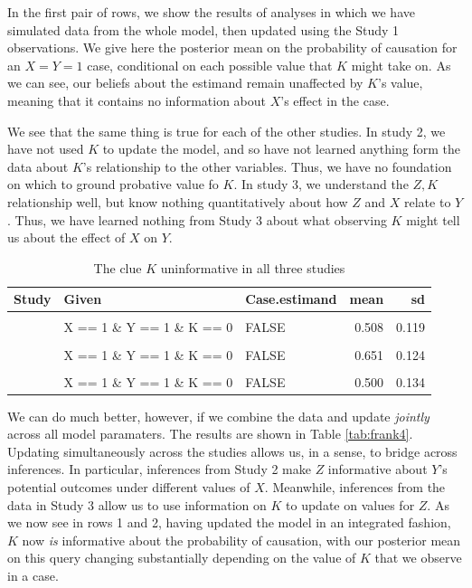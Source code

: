 \documentclass[
  12pt,
]{book}
\begin{document}
In the first pair of rows, we show the results of analyses in which we have simulated data from the whole model, then updated using the Study 1 observations. We give here the posterior mean on the probability of causation for an \(X=Y=1\) case, conditional on each possible value that \(K\) might take on. As we can see, our beliefs about the estimand remain unaffected by \(K\)'s value, meaning that it contains no information about \(X\)'s effect in the case.

We see that the same thing is true for each of the other studies. In study 2, we have not used \(K\) to update the model, and so have not learned anything form the data about \(K\)'s relationship to the other variables. Thus, we have no foundation on which to ground probative value fo \(K\). In study 3, we understand the \(Z,K\) relationship well, but know nothing quantitatively about how \(Z\) and \(X\) relate to \(Y\). Thus, we have learned nothing from Study 3 about what observing \(K\) might tell us about the effect of \(X\) on \(Y\).

\begin{table}

\caption{\label{tab:frank1}The clue $K$ uninformative in all three studies}
\centering
\begin{tabular}[t]{rllrr}
\toprule
Study & Given & Case.estimand & mean & sd\\
\midrule
\cellcolor{gray!6}{1} & \cellcolor{gray!6}{X == 1 \& Y == 1 \& K == 1} & \cellcolor{gray!6}{FALSE} & \cellcolor{gray!6}{0.592} & \cellcolor{gray!6}{0.126}\\
 & X == 1 \& Y == 1 \& K == 0 & FALSE & 0.508 & 0.119\\
\cellcolor{gray!6}{2} & \cellcolor{gray!6}{X == 1 \& Y == 1 \& K == 1} & \cellcolor{gray!6}{FALSE} & \cellcolor{gray!6}{0.650} & \cellcolor{gray!6}{0.122}\\
 & X == 1 \& Y == 1 \& K == 0 & FALSE & 0.651 & 0.124\\
\cellcolor{gray!6}{3} & \cellcolor{gray!6}{X == 1 \& Y == 1 \& K == 1} & \cellcolor{gray!6}{FALSE} & \cellcolor{gray!6}{0.500} & \cellcolor{gray!6}{0.158}\\
\addlinespace
 & X == 1 \& Y == 1 \& K == 0 & FALSE & 0.500 & 0.134\\
\bottomrule
\end{tabular}
\end{table}

We can do much better, however, if we combine the data and update \emph{jointly} across all model paramaters. The results are shown in Table \ref{tab:frank4}. Updating simultaneously across the studies allows us, in a sense, to bridge across inferences. In particular, inferences from Study 2 make \(Z\) informative about \(Y\)'s potential outcomes under different values of \(X\). Meanwhile, inferences from the data in Study 3 allow us to use information on \(K\) to update on values for \(Z\). As we now see in rows 1 and 2, having updated the model in an integrated fashion, \(K\) now \emph{is} informative about the probability of causation, with our posterior mean on this query changing substantially depending on the value of \(K\) that we observe in a case.
\end{document}
